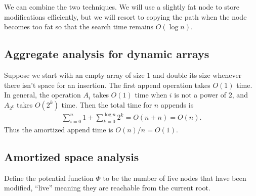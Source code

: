 We can combine the two techniques.
We will use a slightly fat node to store modifications efficiently, but we
will resort to copying the path when the node becomes too fat so that the
search time remains $O(\log n)$.

\subsection{Aggregate analysis for dynamic arrays} \label{sec:agg}
Suppose we start with an empty array of size $1$ and double its size
whenever there isn't space for an insertion.
The first append operation takes $O(1)$ time.
In general, the operation $A_i$ takes $O(1)$ time when $i$ is not a power
of $2$, and $A_{2^k}$ takes $O(2^k)$ time.
Then the total time for $n$ appends is \begin{align*}
    \sum_{i=0}^n 1 + \sum_{k = 0}^{\log n} 2^k = O(n + n) = O(n).
\end{align*}
Thus the amortized append time is $O(n) / n = O(1)$.

\subsection{Amortized space analysis} \label{sec:pbst:space}
Define the potential function $\Phi$ to be the number of live nodes that
have been modified, ``live'' meaning they are reachable from the current
root.
